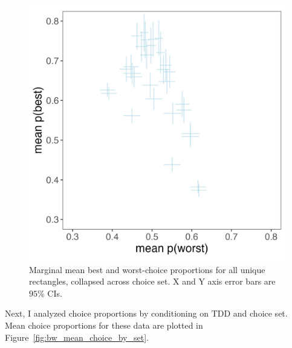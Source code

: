 \begin{figure}
   \includegraphics[width=\linewidth]{figures/crit_mean_props_marginal.jpeg}
   \caption{Marginal mean best and worst-choice proportions for all unique rectangles, collapsed across choice set. X and Y axis error bars are $95\%$ CIs.}
   \label{fig:bw_marginal}
\end{figure}

Next, I analyzed choice proportions by conditioning on TDD and choice set. Mean choice proportions for these data are plotted in Figure~\ref{fig:bw_mean_choice_by_set}. 

